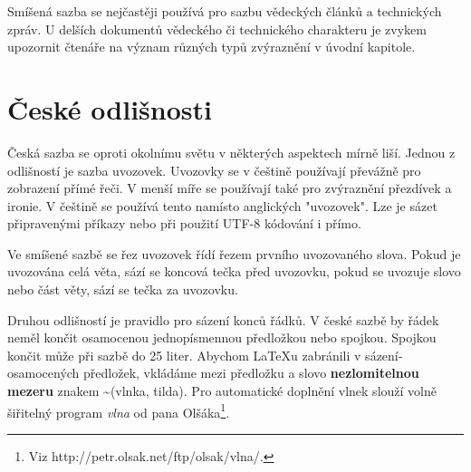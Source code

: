\documentclass[11pt, a4paper,twocolumn]{article}
\begin{document}
Smíšená sazba se nejčastěji používá pro sazbu vědeckých článků a technických zpráv. U delší­ch dokumentů vědeckého či technického charakteru je zvykem upozornit čtenáře na význam různých typů zvýraznění­ v úvodní­ kapitole.

\section{České odlišnosti}
Česká sazba se oproti okolní­mu světu v některých aspektech mí­rně liší­. Jednou z odlišností je sazba uvozovek. Uvozovky se v češtině použí­vají­ převážně pro zobrazení­ pří­mé řeči. V menší­ míře se použí­vají­ také pro zvýraznění­ přezdí­vek a ironie. V češtině se použí­vá tento \textbf{} namí­sto anglických "uvozovek". Lze je sázet připravenými příkazy nebo při použití UTF-8 kódování i přímo.

Ve smíšené sazbě se řez uvozovek ří­dí­ řezem první­ho uvozovaného slova. Pokud je uvozována celá věta, sází­ se koncová tečka před uvozovku, pokud se uvozuje slovo nebo část věty, sází­ se tečka za uvozovku.

Druhou odlišností je pravidlo pro sázení­ konců řádků. V české sazbě by řádek neměl končit osamocenou jednopí­smennou předložkou nebo spojkou. Spojkou  končit může při sazbě do 25 liter. Abychom {\LaTeX}u zabránili v sázení­ osamocených předložek, vkládáme mezi předložku a slovo \textbf{nezlomitelnou mezeru} znakem \textasciitilde  (vlnka, tilda). Pro automatické doplnění vlnek slouží­ volně šiřitelný program \textit{vlna} od pana Olšáka\footnote{Viz http://petr.olsak.net/ftp/olsak/vlna/.}.
\end{document}
